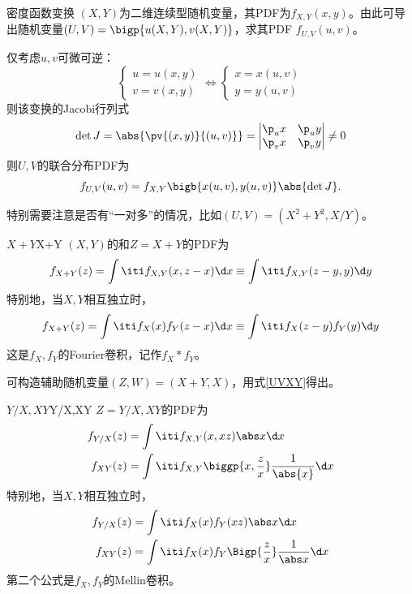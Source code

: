 \begin{theorem}
	{密度函数变换}{}
	$(X,Y)$为二维连续型随机变量，其PDF为$f_{X,Y}(x,y)$。由此可导出随机变量$(U,V)=\bigp{u(X,Y),v(X,Y)}$，求其PDF $f_{U,V}(u,v)$。
	
	仅考虑$u,v$可微可逆：
	\[
		\begin{cases}
			u=u(x,y)\\
			v=v(x,y)
		\end{cases}\iff
		\begin{cases}
			x=x(u,v)\\
			y=y(u,v)
		\end{cases}
	\]
	则该变换的Jacobi行列式
	\[
		\det J=\abs{\pv{(x,y)}{(u,v)}}=\begin{vmatrix}
			\p_u x&\p_u y\\\p_v x&\p_v y
		\end{vmatrix}\neq 0
	\]
	则$U,V$的联合分布PDF为
	\begin{equation}
		\label{UVXY}
		f_{U,V}(u,v)=f_{X,Y}\bigb{x(u,v),y(u,v)}\abs{\det J}.
	\end{equation}
\end{theorem}
\begin{remark}
	特别需要注意是否有“一对多”的情况，比如$(U,V)=(X^2+Y^2,X/Y)$。
\end{remark}
\begin{example}{$X+Y$}{X+Y}
	$(X,Y)$的和$Z=X+Y$的PDF为
	\begin{equation}
		f_{X+Y}(z)=\int\iti f_{X,Y}(x,z-x)\d x\equiv\int\iti f_{X,Y}(z-y,y)\d y
	\end{equation}
	特别地，当$X,Y$相互独立时，%
	\[
		f_{X+Y}(z)=\int\iti f_X(x)f_Y(z-x)\d x\equiv\int\iti f_X(z-y)f_Y(y)\d y
	\]
	这是$f_X,f_Y$的Fourier卷积，记作$f_X\ast f_Y$。
\end{example}
\begin{remark}
	可构造辅助随机变量$(Z,W)=(X+Y,X)$，用式\eqref{UVXY}得出。
\end{remark}
\begin{example}{$Y/X,XY$}{Y/X,XY}
	$Z=Y/X,XY$的PDF为
	\begin{subequations}
		\begin{align}
			f_{Y/X}(z)&=\int\iti f_{X,Y}(x,xz)\abs x\d x\\
			f_{XY}(z)&=\int\iti f_{X,Y}\biggp{x,\frac zx}\frac1{\abs{x}}\d x
		\end{align}
	\end{subequations}
	特别地，当$X,Y$相互独立时，
	\begin{subequations}
		\begin{align}
			f_{Y/X}(z)&=\int\iti f_X(x)f_Y(xz)\abs x\d x\\
			f_{XY}(z)&=\int\iti f_X(x)f_Y\Bigp{\frac zx}\frac1{\abs x}\d x
		\end{align}
	\end{subequations}
	第二个公式是$f_X,f_Y$的Mellin卷积。
\end{example}
